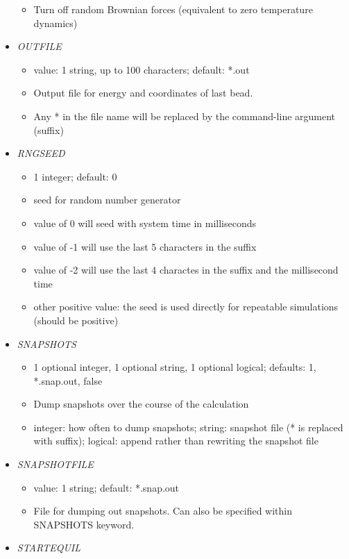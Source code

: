 \documentclass[12pt]{article}
\begin{document}
\begin{itemize}
\begin{itemize}
       \item Turn off random Brownian forces (equivalent to zero temperature dynamics)
     \end{itemize}   
%    
\item {\it OUTFILE}
    \begin{itemize}
      \item  value: 1 string, up to 100 characters; default: *.out
      \item Output file for energy and coordinates of last bead.
      \item Any * in the file name will be replaced by the command-line argument (suffix)  
      \end{itemize}
%    
\item {\it RNGSEED}
  \begin{itemize}
    \item 1 integer; default: 0
    \item seed for random number generator
    \item value of 0 will seed with system time in milliseconds
    \item value of -1 will use the last 5 characters in the suffix
    \item value of -2 will use the last 4 charactes in the suffix and the millisecond time
    \item other positive value: the seed is used directly for repeatable simulations (should be positive)
  \end{itemize}
%
\item {\it SNAPSHOTS}
  \begin{itemize}
    \item 1 optional integer, 1 optional string, 1 optional logical; defaults: 1, *.snap.out, false 
    \item Dump snapshots over the course of the calculation
    \item integer: how often to dump snapshots; string: snapshot file (* is replaced with suffix); logical: append rather than rewriting the snapshot file
   \end{itemize}
%
\item {\it SNAPSHOTFILE}
    \begin{itemize}
      \item  value: 1 string; default: *.snap.out
      \item File for dumping out snapshots. Can also be specified within SNAPSHOTS keyword.   
    \end{itemize} 
%
\item {\it STARTEQUIL}

\end{itemize}
\end{document}
